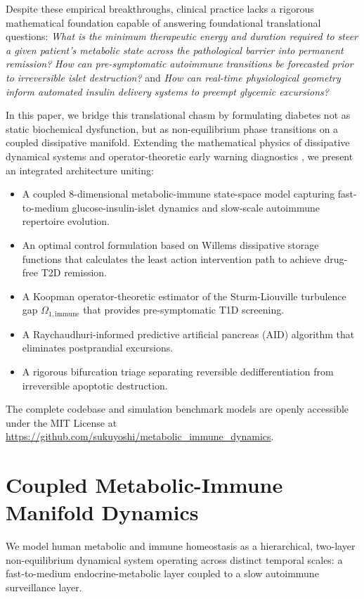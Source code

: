 \documentclass[11pt,a4paper]{article}
\begin{document}
Despite these empirical breakthroughs, clinical practice lacks a rigorous mathematical foundation capable of answering foundational translational questions: \emph{What is the minimum therapeutic energy and duration required to steer a given patient's metabolic state across the pathological barrier into permanent remission?} \emph{How can pre-symptomatic autoimmune transitions be forecasted prior to irreversible islet destruction?} and \emph{How can real-time physiological geometry inform automated insulin delivery systems to preempt glycemic excursions?}

In this paper, we bridge this translational chasm by formulating diabetes not as static biochemical dysfunction, but as non-equilibrium phase transitions on a coupled dissipative manifold. Extending the mathematical physics of dissipative dynamical systems \cite{Willems1972, Prigogine1977} and operator-theoretic early warning diagnostics \cite{Scheffer2009, Yoshikai2026f, Yoshikai2026g}, we present an integrated architecture uniting:
\begin{itemize}
    \item A coupled 8-dimensional metabolic-immune state-space model capturing fast-to-medium glucose-insulin-islet dynamics and slow-scale autoimmune repertoire evolution.
    \item An optimal control formulation based on Willems dissipative storage functions that calculates the least action intervention path to achieve drug-free T2D remission.
    \item A Koopman operator-theoretic estimator of the Sturm-Liouville turbulence gap $\Omega_{1,\mathrm{immune}}$ that provides pre-symptomatic T1D screening.
    \item A Raychaudhuri-informed predictive artificial pancreas (AID) algorithm that eliminates postprandial excursions.
    \item A rigorous bifurcation triage separating reversible dedifferentiation from irreversible apoptotic destruction.
\end{itemize}
The complete codebase and simulation benchmark models are openly accessible under the MIT License at \url{https://github.com/sukuyoshi/metabolic_immune_dynamics}.

\section{Coupled Metabolic-Immune Manifold Dynamics}

We model human metabolic and immune homeostasis as a hierarchical, two-layer non-equilibrium dynamical system operating across distinct temporal scales: a fast-to-medium endocrine-metabolic layer coupled to a slow autoimmune surveillance layer.
\end{document}
